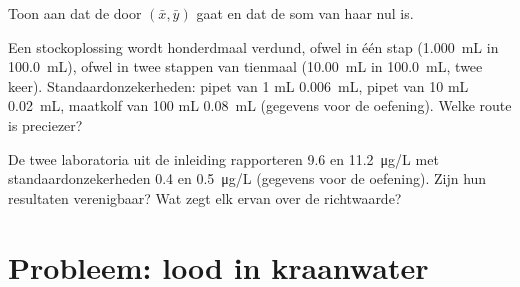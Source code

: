 \begin{exercise}[$\star\star\star$]\label{exo:b2:measurement-statistics:10}
Toon aan dat de  door $(\bar x, \bar y)$ gaat en dat de som van haar  nul is.
\end{exercise}

\begin{exercise}[$\star\star\star$]\label{exo:b2:measurement-statistics:11}
Een stockoplossing wordt honderdmaal verdund, ofwel in één stap (\qty{1.000}{mL} in \qty{100.0}{mL}), ofwel
in twee stappen van tienmaal (\qty{10.00}{mL} in \qty{100.0}{mL}, twee keer). Standaardonzekerheden: pipet van 1 mL
\qty{0.006}{mL}, pipet van 10 mL \qty{0.02}{mL}, maatkolf van 100 mL \qty{0.08}{mL} (gegevens voor de oefening).
Welke route is preciezer?
\end{exercise}

\begin{exercise}[$\star\star\star$]\label{exo:b2:measurement-statistics:12}
De twee laboratoria uit de inleiding rapporteren 9.6 en \qty{11.2}{\micro g/L} met standaardonzekerheden
0.4 en \qty{0.5}{\micro g/L} (gegevens voor de oefening). Zijn hun resultaten verenigbaar? Wat zegt elk ervan over de
richtwaarde?
\end{exercise}

\section{Probleem: lood in kraanwater}

